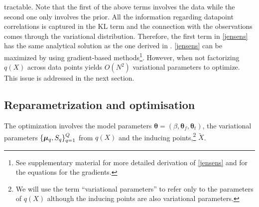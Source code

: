 \documentclass{article} %
\begin{document}
tractable. Note that the first of the above terms involves the data while
the second one only involves the prior. All the information regarding
datapoint correlations is captured in the $\text{KL}$ term and the
connection with the observations comes through the variational
distribution. Therefore, the first term in \eqref{jensens} has the
same analytical solution as the one derived in \cite{BayesianGPLVM}.
%
\eqref{jensens} can be maximized by using gradient-based
methods\footnote{See supplementary material for more detailed
  derivation of \eqref{jensens} and for the equations for the
  gradients.}. However, when not factorizing $q(X)$ across data points
yields $O(N^2)$ variational parameters to optimize. 
This issue is addressed in the next section.



\subsection{Reparametrization and optimisation \label{optimisation}} 

The optimization involves the model parameters 
$\boldsymbol \theta = (\beta, \boldsymbol \theta_f, \boldsymbol \theta_t)$, 
the variational parameters $\{ \boldsymbol \mu_q, S_q \}_{q=1}^Q$ from $q(X)$ and the inducing points,\footnote{We will use the term ``variational parameters'' to refer only to the parameters of $q(X)$ although the inducing points are also variational parameters.} $\tilde{X}$.
\end{document}
